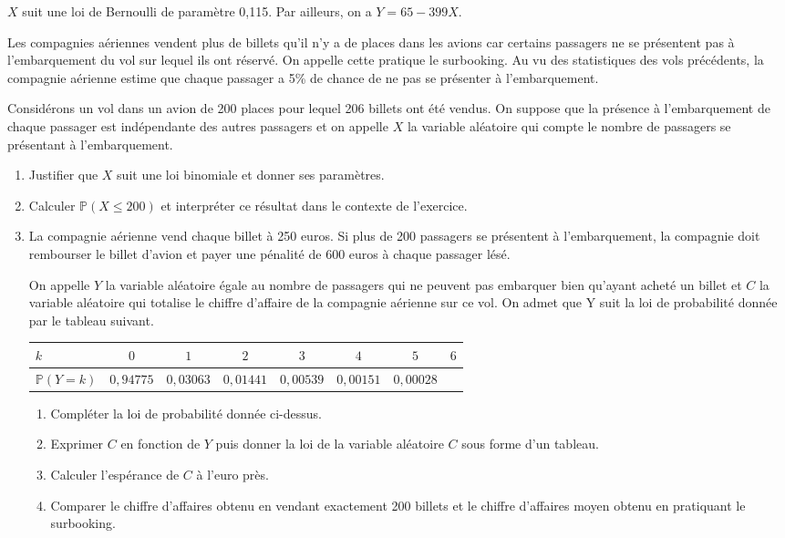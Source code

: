 \documentclass[11pt,fleqn, openany]{book} %
\begin{document}
\begin{solution}$X$ suit une loi de Bernoulli de paramètre 0,115. Par ailleurs, on a $Y=65-399X$.\end{solution}



\begin{exercise}[subtitle={(Asie 2022)}]Les compagnies aériennes vendent plus de billets qu'il n'y a de places dans les avions car certains passagers ne se présentent pas à l'embarquement du vol sur lequel ils ont réservé. On appelle cette pratique le surbooking. Au vu des statistiques des vols précédents, la compagnie aérienne estime que chaque passager a 5\% de chance de ne pas se présenter à l'embarquement.

Considérons un vol dans un avion de 200 places pour lequel 206 billets ont été vendus. On suppose que la présence à l'embarquement de chaque passager est indépendante des autres passagers et on appelle $X$ la variable aléatoire qui compte le nombre de passagers se présentant à l'embarquement.

\begin{enumerate}
\item Justifier que $X$ suit une loi binomiale et donner ses paramètres.
\item Calculer $\mathbb{P}(X \leqslant 200)$ et interpréter ce résultat dans le contexte de l'exercice.
\item La compagnie aérienne vend chaque billet à 250 euros. Si plus de 200 passagers se présentent à l'embarquement, la compagnie doit rembourser le billet d'avion et payer une pénalité de 600 euros à chaque passager lésé.

On appelle $Y$ la variable aléatoire égale au nombre de passagers qui ne peuvent pas embarquer bien qu'ayant acheté un billet et $C$ la variable aléatoire qui totalise le chiffre d'affaire de la compagnie aérienne sur ce vol. On admet que Y suit la loi de probabilité donnée par le tableau suivant.

\begin{center}
\begin{tabular}{|l|c|c|c|c|c|c|c|}
\hline
$k$ & $0$& $1$ & $2$ & $3$ & $4$ & $5$ & $6$ \\
\hline
$\mathbb{P}(Y=k)$ & $0,94775$ & $0,03063$ & $0,01441$   & $0,00539$ & $0,00151$ & $0,00028$ & \\
\hline \end{tabular}
\end{center}

\begin{enumerate}
\item Compléter la loi de probabilité donnée ci-dessus.
\item Exprimer $C$ en fonction de $Y$ puis donner la loi de la variable aléatoire $C$ sous forme d'un tableau.
\item Calculer l'espérance de $C$ à l'euro près.
\item Comparer le chiffre d'affaires obtenu en vendant exactement 200 billets et le chiffre d'affaires moyen obtenu en pratiquant le surbooking.
\end{enumerate}
\end{enumerate}\end{exercise}
\end{document}
